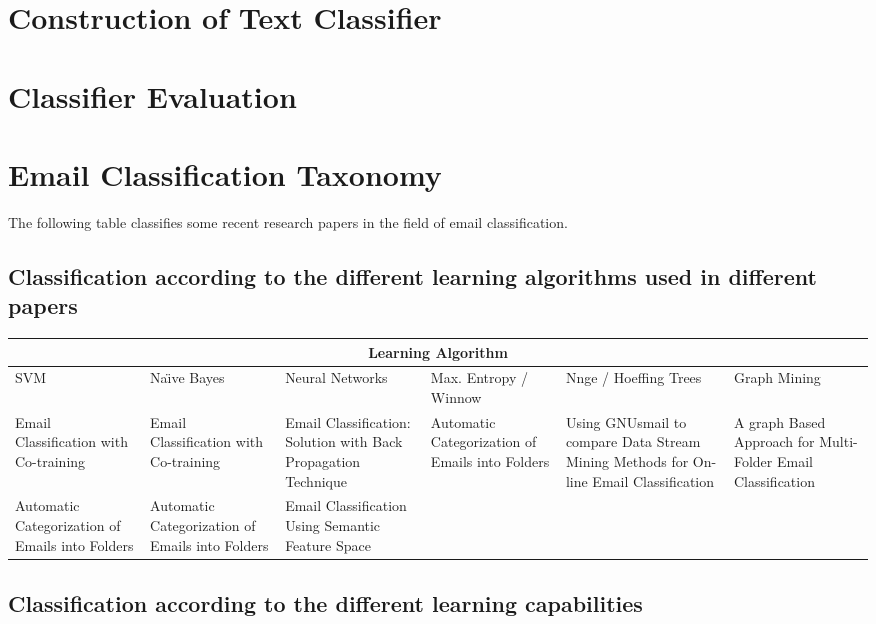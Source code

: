 \section{Construction of Text Classifier}
\section{Classifier Evaluation}


\section{Email Classification Taxonomy}
The following table classifies some recent research papers in the field of email classification.

\subsection{Classification according to the different learning algorithms used in different papers}

\begin{center}
\begin{tabular}{|p{2cm}|p{2cm}|p{2cm}|p{2cm}|p{2cm}|p{2cm}|}
\hline
\multicolumn{6}{|c|}{Learning Algorithm} \\
\hline
SVM & Na\"{\i}ve Bayes & Neural Networks & Max. Entropy / Winnow & Nnge / Hoeffing Trees & Graph Mining \\ \hline
Email Classification with Co-training \cite{SVETLANA01} &
Email Classification with Co-training \cite{SVETLANA01} &
Email Classification: Solution with Back Propagation Technique \cite{mous05} & 
Automatic Categorization of Emails into Folders \cite{RON04} &
Using GNUsmail to compare Data Stream Mining Methods for On-line Email Classification \cite{JOSE11} &
A graph Based Approach for Multi-Folder Email Classification \cite{sift02} \\ \hline

Automatic Categorization of Emails into Folders \cite{RON04} &
Automatic Categorization of Emails into Folders \cite{RON04} &
Email Classification Using Semantic Feature Space \cite{YUN08} & 
&
& \\ \hline
\end{tabular}
\end{center}
\newpage

\subsection{Classification according to the different learning capabilities}

